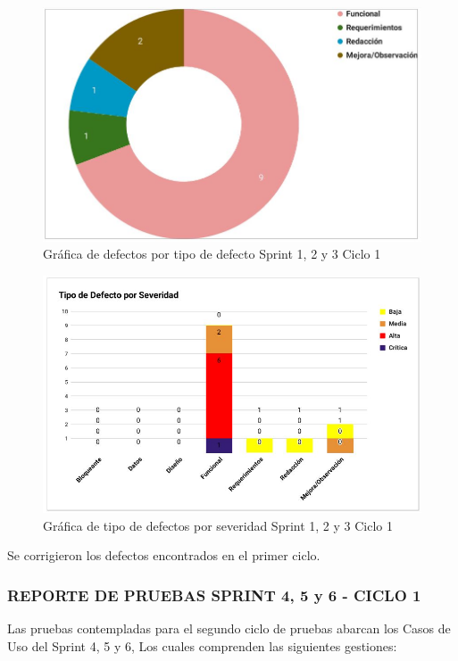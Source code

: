 \begin{figure}[H]
	\begin{center}
		\includegraphics[width=.75\textwidth]{images/pruebas/s1c1-2}
		\caption{Gráfica de defectos por tipo de defecto Sprint 1, 2 y 3 Ciclo 1}
		\label{fig:infos1c1-2}
	\end{center}
\end{figure}

\newpage

\begin{figure}[H]
	\begin{center}
		\includegraphics[width=.95\textwidth]{images/pruebas/s1c1-3}
		\caption{Gráfica de tipo de defectos por severidad Sprint 1, 2 y 3 Ciclo 1}
		\label{fig:infos1c1-3}
	\end{center}
\end{figure}

Se corrigieron los defectos encontrados en el primer ciclo.
\newpage

\subsubsection{REPORTE DE PRUEBAS SPRINT 4, 5 y 6 - CICLO 1}
Las pruebas contempladas para el segundo ciclo de pruebas abarcan los Casos de Uso del Sprint 4, 5 y 6, Los cuales comprenden las siguientes gestiones:

